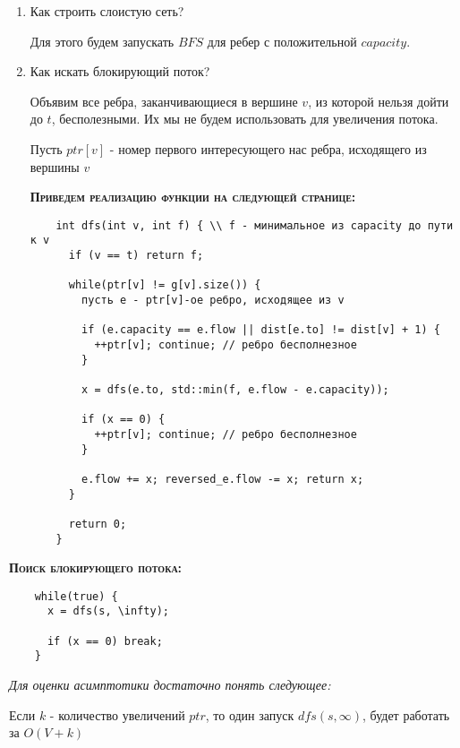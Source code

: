   \begin{enumerate}
    \item Как строить слоистую сеть?

    Для этого будем запускать $BFS$ для ребер с положительной $capacity$.

    \item Как искать блокирующий поток?
    
    Объявим все ребра, заканчивающиеся в вершине $v$, из которой нельзя дойти до $t$, бесполезными. Их мы не будем использовать для увеличения потока.

    Пусть $ptr[v]$ - номер первого интересующего нас ребра, исходящего из вершины $v$


    \textbf{\textsc{Приведем реализацию функции на следующей странице:}}
  \newpage
  \begin{verbatim}
    int dfs(int v, int f) { \\ f - минимальное из capacity до пути к v
      if (v == t) return f;
  
      while(ptr[v] != g[v].size()) {
        пусть e - ptr[v]-ое ребро, исходящее из v

        if (e.capacity == e.flow || dist[e.to] != dist[v] + 1) {
          ++ptr[v]; continue; // ребро бесполнезное
        }

        x = dfs(e.to, std::min(f, e.flow - e.capacity));
  
        if (x == 0) {
          ++ptr[v]; continue; // ребро бесполнезное
        }

        e.flow += x; reversed_e.flow -= x; return x;
      }

      return 0;
    }
  \end{verbatim}
  \end{enumerate}

  \textbf{\textsc{Поиск блокирующего потока:}}

  \begin{verbatim}
    while(true) {
      x = dfs(s, \infty);

      if (x == 0) break;
    }
  \end{verbatim}

  \textit{Для оценки асимптотики достаточно понять следующее:}
  \begin{note}
    Если $k$ - количество увеличений $ptr$, то один запуск $dfs(s, \infty)$, будет работать за $O(V + k)$
  \end{note}

